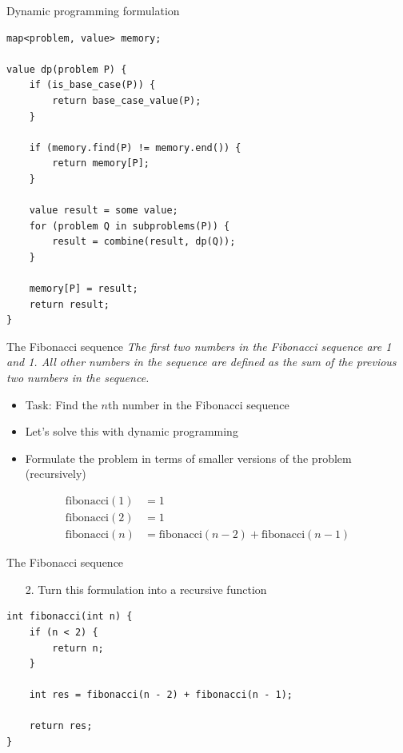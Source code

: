 \documentclass{beamer}
\begin{document}
\begin{frame}{Dynamic programming formulation}
    \begin{verbatim}
map<problem, value> memory;

value dp(problem P) {
    if (is_base_case(P)) {
        return base_case_value(P);
    }

    if (memory.find(P) != memory.end()) {
        return memory[P];
    }

    value result = some value;
    for (problem Q in subproblems(P)) {
        result = combine(result, dp(Q));
    }

    memory[P] = result;
    return result;
}
    \end{verbatim}
\end{frame}

\begin{frame}[plain]{The Fibonacci sequence}
    \vspace{5pt}
    \textit{The first two numbers in the Fibonacci sequence are 1 and 1. All
            other numbers in the sequence are defined as the sum of the previous two
            numbers in the sequence.}

    \vspace{5pt}
    \begin{itemize}
        \item Task: Find the $n$th number in the Fibonacci sequence
        \item Let's solve this with dynamic programming
    \end{itemize}

    \vspace{5pt}
    \begin{itemize}
        \item Formulate the problem in terms of smaller versions of the problem (recursively)
    \end{itemize}

    \begin{align*}
        \mathrm{fibonacci}(1) &= 1\\
        \mathrm{fibonacci}(2) &= 1\\
        \mathrm{fibonacci}(n) &= \mathrm{fibonacci}(n - 2) + \mathrm{fibonacci}(n - 1)
    \end{align*}
\end{frame}

\begin{frame}{The Fibonacci sequence}
    \begin{itemize}
        \item[2.] Turn this formulation into a recursive function
    \end{itemize}

    \begin{verbatim}
int fibonacci(int n) {
    if (n < 2) {
        return n;
    }

    int res = fibonacci(n - 2) + fibonacci(n - 1);

    return res;
}
    \end{verbatim}
\end{frame}
\end{document}
